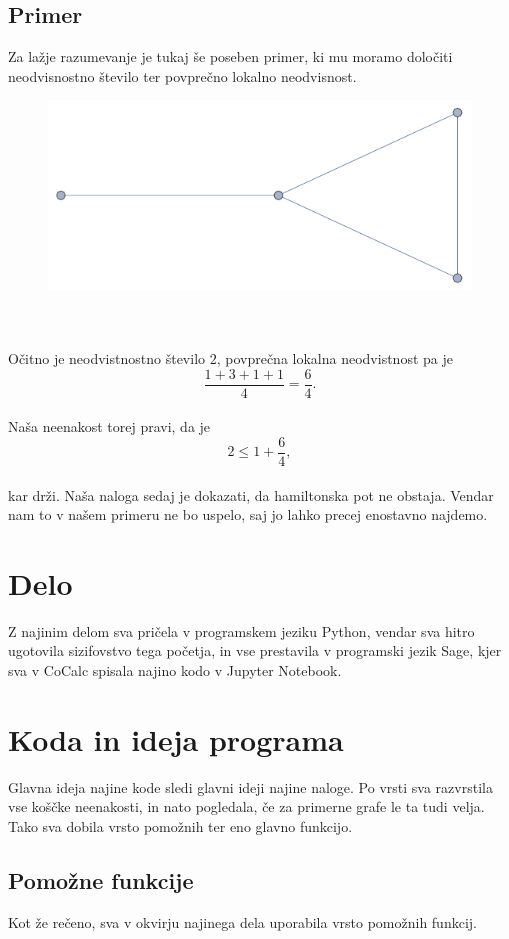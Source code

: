 \documentclass[12pt,a4paper]{amsart}
\theoremstyle{definition} %
\theoremstyle{plain} %
\begin{document}
\subsection{Primer}
Za lažje razumevanje je tukaj še poseben primer, ki mu moramo določiti neodvisnostno število ter povprečno lokalno neodvisnost.\\
\begin{figure}[h]
	\centering
	\includegraphics{slike/grafek}
\end{figure}
\\
\\
Očitno je neodvistnostno število $2$, povprečna lokalna neodvistnost pa je\\ $$\frac{1+3+1+1}{4}=\frac{6}{4}.$$
\ \\
Naša neenakost torej pravi, da je $$2 \leq 1+ \frac{6}{4},$$ 
\\kar drži. Naša naloga sedaj je dokazati, da hamiltonska pot ne obstaja. Vendar nam to v našem primeru ne bo uspelo, saj jo lahko precej enostavno najdemo.
\section{Delo}
Z najinim delom sva pričela v programskem jeziku Python, vendar sva hitro ugotovila sizifovstvo tega početja, in vse prestavila v programski jezik Sage, kjer sva v CoCalc spisala najino kodo v Jupyter Notebook. \\
\section{Koda in ideja programa}
Glavna ideja najine kode sledi glavni ideji najine naloge. Po vrsti sva razvrstila vse koščke neenakosti, in nato pogledala, če za primerne grafe le ta tudi velja. Tako sva dobila vrsto pomožnih ter eno glavno funkcijo.
\subsection{Pomožne funkcije}
Kot že rečeno, sva v okvirju najinega dela uporabila vrsto pomožnih funkcij. 
\end{document}
